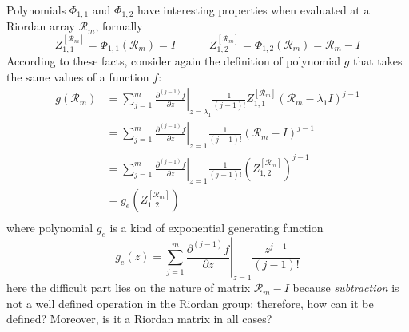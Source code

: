 
Polynomials $\Phi_{ 1, 1 }$ and $\Phi_{ 1, 2 }$ have interesting properties
when evaluated at a Riordan array $\mathcal{R}_{m}$, formally
\begin{displaymath}
 Z_{1,1}^{[\mathcal{R}_{m}]} = \Phi_{ 1, 1 }{\left (\mathcal{R}_{m} \right )} = I \quad\quad\quad
 Z_{1,2}^{[\mathcal{R}_{m}]} = \Phi_{ 1, 2 }{\left (\mathcal{R}_{m} \right )} = \mathcal{R}_{m} - I
\end{displaymath}
According to these facts, consider again the definition of polynomial $g$ that takes the same values of a function $f$:
\begin{displaymath}
\begin{split}
    g(\mathcal{R}_{m}) &= \sum_{j=1}^{m}{ \left. \frac{\partial^{(j-1)}{f}}{\partial{z}} \right|_{z=\lambda_{1}}\frac{1}{(j-1)!}{Z_{1,1}^{[\mathcal{R}_{m}]} (\mathcal{R}_{m}-\lambda_{1}I)^{j-1}} }\\
                       &= \sum_{j=1}^{m}{ \left. \frac{\partial^{(j-1)}{f}}{\partial{z}} \right|_{z=1}\frac{1}{(j-1)!}{(\mathcal{R}_{m}-I)^{j-1}} }\\
                       &= \sum_{j=1}^{m}{ \left. \frac{\partial^{(j-1)}{f}}{\partial{z}} \right|_{z=1}\frac{1}{(j-1)!}{\left(Z_{1,2}^{[\mathcal{R}_{m}]}\right)^{j-1}} }\\
                       &= g_{e}\left(Z_{1,2}^{[\mathcal{R}_{m}]}\right)\\
\end{split}
\end{displaymath}
where polynomial $g_{e}$ is a kind of exponential generating function
\begin{displaymath}
    g_{e}\left(z\right) = \sum_{j=1}^{m}{ \left. \frac{\partial^{(j-1)}{f}}{\partial{z}} \right|_{z=1}\frac{z^{j-1}}{(j-1)!}}
\end{displaymath}
here the difficult part lies on the nature of matrix $\mathcal{R}_{m}-I$
because \textit{subtraction} is not a well defined operation in the Riordan
group; therefore, how can it be defined?  Moreover, is it a Riordan matrix in
all cases?
